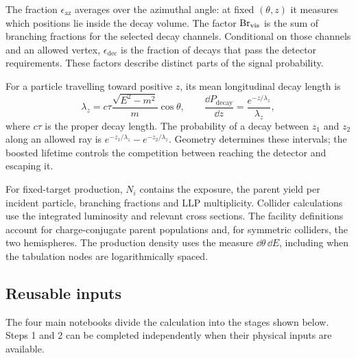 The fraction $\epsilon_{\mathrm{az}}$ averages over the azimuthal angle: at fixed $(\theta,z)$ it measures which positions lie inside the decay volume. The factor $\operatorname{Br}_{\mathrm{vis}}$ is the sum of branching fractions for the selected decay channels. Conditional on those channels and an allowed vertex, $\epsilon_{\mathrm{dec}}$ is the fraction of decays that pass the detector requirements. These factors describe distinct parts of the signal probability.

For a particle travelling toward positive $z$, its mean longitudinal decay length is
\begin{equation}\label{eq:lifetime}
 \lambda_z=c\tau\frac{\sqrt{E^2-m^2}}{m}\cos\theta,
 \qquad
 \frac{\dd P_{\mathrm{decay}}}{\dd z}=\frac{e^{-z/\lambda_z}}{\lambda_z},
\end{equation}
where $c\tau$ is the proper decay length. The probability of a decay between $z_1$ and $z_2$ along an allowed ray is $e^{-z_1/\lambda_z}-e^{-z_2/\lambda_z}$. Geometry determines these intervals; the boosted lifetime controls the competition between reaching the detector and escaping it.

For fixed-target production, $N_i$ contains the exposure, the parent yield per incident particle, branching fractions and LLP multiplicity. Collider calculations use the integrated luminosity and relevant cross sections. The facility definitions account for charge-conjugate parent populations and, for symmetric colliders, the two hemispheres. The production density uses the measure $\dd\theta\,\dd E$, including when the tabulation nodes are logarithmically spaced.

\subsection{Reusable inputs}
The four main notebooks divide the calculation into the stages shown below. Steps 1 and 2 can be completed independently when their physical inputs are available.

\begin{center}
\end{center}

